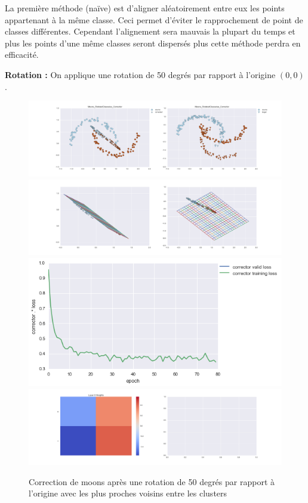 La première méthode (naïve) est d'aligner aléatoirement entre eux les points appartenant à la même classe.
Ceci permet d'éviter le rapprochement de point de classes différentes. Cependant l'alignement sera mauvais
la plupart du temps et plus les points d'une même classes seront dispersés plus cette méthode perdra en efficacité.


{\Large \textbf{Rotation :}} On applique une rotation de 50 degrés par rapport à l'origine $(0,0)$.

\begin{figure}[H] %
\centering
\includegraphics[width=\linewidth]{fig/24-05-2016/moons/Moons_RotatedClasswise_Corrector-DATA.png}
\includegraphics[width=\linewidth]{fig/24-05-2016/moons/Moons_RotatedClasswise_Corrector-GridCheck.png}
\includegraphics[width=0.45\linewidth]{fig/24-05-2016/moons/Moons_RotatedClasswise_Corrector-Learning_curve.png}
\includegraphics[width=\linewidth]{fig/24-05-2016/moons/Moons_RotatedClasswise_Corrector-W.png}
\caption{Correction de moons après une rotation de 50 degrés par rapport à l'origine avec les plus proches voisins entre les clusters}
\label{fig:recap-moons-rot-classwise}
\end{figure}


